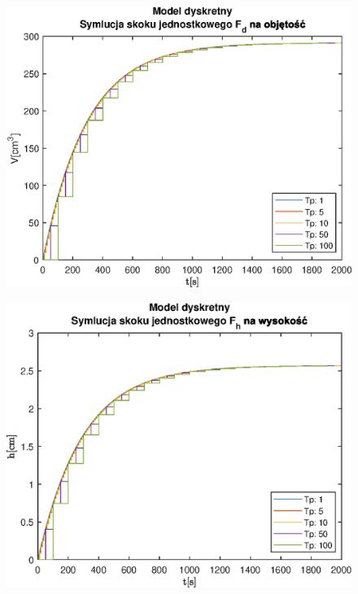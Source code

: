 \begin{figure}[h!]
   \centering
   \includegraphics{img/discrete-step-responses/FdV.eps}
   \caption{}
   \label{}
\end{figure}
            
\begin{figure}[h!]
   \centering
   \includegraphics{img/discrete-step-responses/FhH.eps}
   \caption{}
   \label{}
\end{figure}
            
